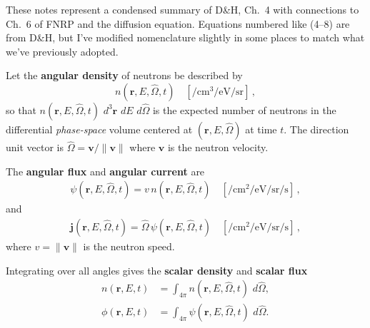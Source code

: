 \documentclass[compact]{ne630handout}
\newcommand{\br}{\mathbf{r}}
\newcommand{\bO}{\hat{\Omega}}
\newcommand{\jj}{\mathbf{j}}
\newcommand{\flux}{\phi}
\newcommand{\angflux}{\psi}
\newcommand{\dV}{\,d^3\br}
\newcommand{\dE}{\,dE}
\newcommand{\dO}{\,d\hat{\Omega}}
\begin{document}
\begin{handoutflow}


These notes represent a condensed summary of D\&H, Ch.~4 with connections
to Ch.~6 of FNRP and the diffusion equation.  Equations numbered like
(4--8) are from D\&H, but I've modified nomenclature slightly in some
places to match what we've previously adopted.



Let the \textbf{angular density} of neutrons be described by
\begin{equation}
  n(\br, E, \bO, t) \quad [ \si{\per\centi\meter\cubed\per\electronvolt\per\steradian} ] \, ,
  \tag{4--8}
\end{equation}
so that $n(\br,E,\bO,t)\,\dV\,\dE\,\dO$ is the expected number of neutrons in the differential \emph{phase-space} volume
centered at $(\br, E, \bO)$ at time $t$. The direction unit vector is
$\bO = \mathbf{v}/\lVert\mathbf{v}\rVert$ where $\mathbf{v}$ is the neutron velocity.

The \textbf{angular flux} and \textbf{angular current} are
\begin{align}
  \tag{4--9}
  \angflux(\br, E, \bO, t) = v\, n(\br, E, \bO, t)  \quad  [\si{\per\centi\meter\squared\per\electronvolt\per\steradian\per\second}] \, ,
\end{align}
and
\begin{align}
  \tag{4--10}
  \jj(\br, E, \bO, t) = \bO\, \angflux(\br, E, \bO, t) \quad  [\si{\per\centi\meter\squared\per\electronvolt\per\steradian\per\second}] \, ,
\end{align}
where $v = \lVert\mathbf{v}\rVert$ is the neutron speed.



Integrating over all angles gives the \textbf{scalar density} and \textbf{scalar flux}
\begin{align}
  n(\br,E,t) &= \int_{4\pi} n(\br, E, \bO, t)\, \dO,
  \tag{4--14}\\
  \flux(\br,E,t) &= \int_{4\pi} \angflux(\br, E, \bO, t)\, \dO.
  \tag{4--15}
\end{align}



\end{handoutflow}
\end{document}

